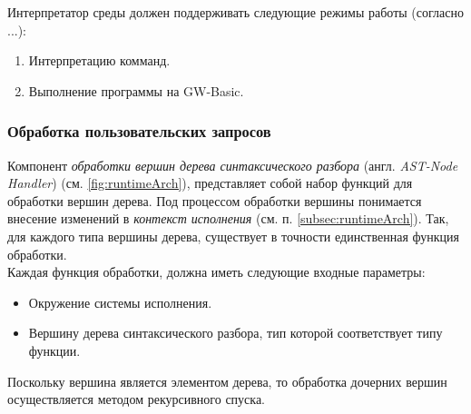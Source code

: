 \documentclass[12pt]{article}
\begin{document}
			\indent Интерпретатор среды должен поддерживать следующие режимы работы (согласно ...):
			\begin{enumerate}
				\item Интерпретацию комманд.
				\item Выполнение программы на GW-Basic.
			\end{enumerate}
			\subsubsection{Обработка пользовательских запросов}
			\hspace{\parindent} Компонент {\it обработки вершин дерева синтаксического разбора} (англ. {\it AST-Node Handler}) (см. \ref{fig:runtimeArch}), представляет собой набор функций для обработки вершин дерева. Под процессом обработки вершины понимается внесение изменений в {\it контекст исполнения} (см. п. \ref{subsec:runtimeArch}). Так, для каждого типа вершины дерева, существует в точности единственная функция обработки. \\
			\indent Каждая функция обработки, должна иметь следующие входные параметры:
			\begin{itemize}
				\item Окружение системы исполнения.
				\item Вершину дерева синтаксического разбора, тип которой соответствует типу функции.
			\end{itemize}
			
			\indent Поскольку вершина является элементом дерева, то обработка дочерних вершин осуществляется методом рекурсивного спуска.
\end{document}
